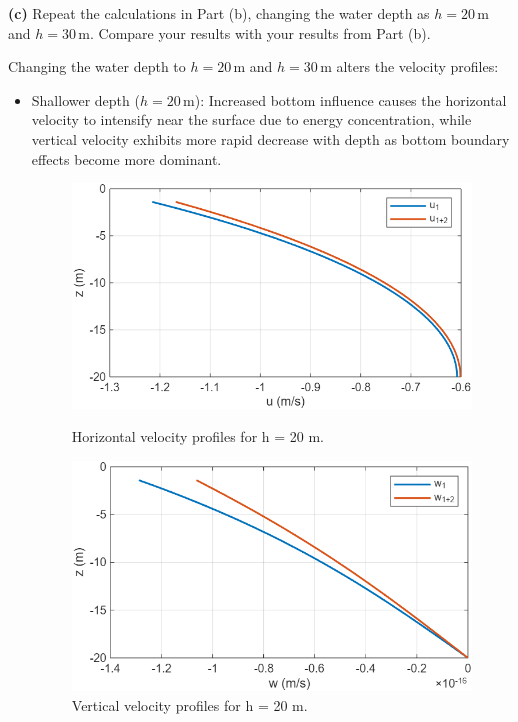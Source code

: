 \documentclass[a4paper]{article}
\begin{document}
\noindent\textbf{(c)} Repeat the calculations in Part (b), changing the water depth as \( h = 20 \, \text{m} \) and \( h = 30 \, \text{m} \). Compare your results with your results from Part (b).
\vspace{0.3cm}

Changing the water depth to \( h = 20 \, \text{m} \) and \( h = 30 \, \text{m} \) alters the velocity profiles:  

\begin{itemize}  
    \item {Shallower depth (\( h = 20 \, \text{m} \))}: Increased bottom influence causes the horizontal velocity to intensify near the surface due to energy concentration, while vertical velocity exhibits more rapid decrease with depth as bottom boundary effects become more dominant. 
    \begin{figure}[H]
        \centering
        \begin{minipage}{0.49\textwidth}
            \centering
            \includegraphics[width=\textwidth]{CE591HW1-Q1c1.png}
            \caption{\small Horizontal velocity profiles for h = 20 m.}
            \label{fig:plot2c_1}
        \end{minipage}
        \hfill
        \begin{minipage}{0.49\textwidth}
            \centering
            \includegraphics[width=\textwidth]{CE591HW1-Q1c2.png}
            \caption{\small Vertical velocity profiles for h = 20 m.}
            \label{fig:plot2c_2}
        \end{minipage}
    \end{figure}


\end{itemize}
\end{document}

